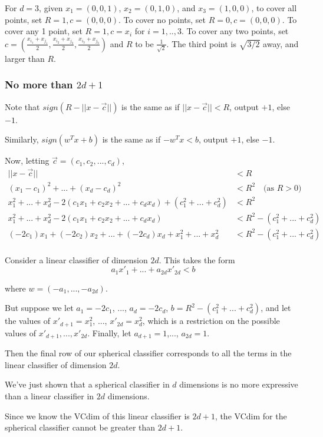 \documentclass[]{article}
\begin{document}
For $d=3$, given $x_1=(0,0,1)$, $x_2=(0,1,0)$, and $x_3=(1,0,0)$, to cover all points, set $R=1, c=(0,0,0)$. To cover no points, set $R=0, c=(0,0,0)$. To cover any 1 point, set $R=1, c=x_i$ for $i=1,..,3$. To cover any two points, set $c=(\frac{x_{i_1}+x_{j_1}}{2}, \frac{x_{i_2}+x_{j_2}}{2}, \frac{x_{i_3}+x_{j_3}}{2})$ and $R$ to be $\frac{1}{\sqrt{2}}$. The third point is $\sqrt{3/2}$ away, and larger than $R$.

\subsubsection{No more than $2d+1$}
Note that $sign(R-||x-\vec c||)$ is the same as if $||x-\vec c|| < R$, output $+1$, else $-1$.

Similarly, $sign(w^Tx+b)$ is the same as if $-w^Tx < b$, output $+1$, else $-1$.

Now, letting $\vec c = (c_1,c_2,...,c_d)$,
\begin{align*}
||x-\vec c|| &< R \\
(x_1-c_1)^2 + ... + (x_d-c_d)^2 &< R^2 \quad \text{(as $R > 0$)}\\
x_1^2 + ... + x_d^2 -2(c_1x_1 + c_2x_2 + ... + c_dx_d) + (c_1^2 + ... + c_d^2) &< R^2 \\
x_1^2 + ... + x_d^2 -2(c_1x_1 + c_2x_2 + ... + c_dx_d) &< R^2 - (c_1^2 + ... + c_d^2) \\
(-2c_1)x_1 + (-2c_2)x_2 + ... + (-2c_d)x_d + x_1^2 + ... + x_d^2 &< R^2 - (c_1^2 + ... + c_d^2) \\
\end{align*}

Consider a linear classifier of dimension $2d$. This takes the form
\[
a_1x'_1 + ... + a_{2d}x'_{2d} < b
\]

where $w = (-a_1,...,-a_{2d})$.

But suppose we let $a_1 = -2c_1$, ..., $a_d = -2c_d$, $b = R^2 - (c_1^2 + ... + c_d^2)$, and let the values of $x'_{d+1} = x_1^2$, ..., $x'_{2d} = x_d^2$, which is a restriction on the possible values of $x'_{d+1},...,x'_{2d}$. Finally, let $a_{d+1} = 1$,..., $a_{2d} = 1$.

Then the final row of our spherical classifier corresponds to all the terms in the linear classifier of dimension $2d$.

We've just shown that a spherical classifier in $d$ dimensions is no more expressive than a linear classifier in $2d$ dimensions.

Since we know the VCdim of this linear classifier is $2d+1$, the VCdim for the spherical classifier cannot be greater than $2d+1$.
\end{document}
